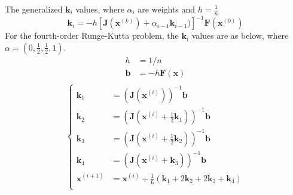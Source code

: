 \documentclass[8pt]{article}
\begin{document}
\begin{multicols}{2}
\begin{description}
    The generalized $\mathbf{k}_i$ values, where $\alpha_i$ are weights and $h=\frac{1}{n}$
    $$ \mathbf{k}_i = -h[\mathbf{J}(\mathbf{x}^{(k)})+\alpha_{i-1}\mathbf{k}_{i-1})]^{-1}\mathbf{F}(\mathbf{x}^{(0)}) $$
    For the fourth-order Runge-Kutta problem, the $\mathbf{k}_i$ values are as below,
    where $\alpha = (0, \frac{1}{2}, \frac{1}{2}, 1)$.
    \begin{equation*}
      \begin{aligned}
        h &= 1/n \\
        \mathbf{b} &=-h\mathbf{F}(\mathbf{x}) \\
      \end{aligned}
    \end{equation*}
    \begin{equation*}
      \left\{
        \begin{aligned}
          \mathbf{k}_1 &= (\mathbf{J}(\mathbf{x}^{(i)}))^{-1}\mathbf{b} \\
          \mathbf{k}_2 &= (\mathbf{J}(\mathbf{x}^{(i)}+\frac{1}{2}\mathbf{k}_1))^{-1}\mathbf{b} \\
          \mathbf{k}_3 &= (\mathbf{J}(\mathbf{x}^{(i)}+\frac{1}{2}\mathbf{k}_2))^{-1}\mathbf{b} \\
          \mathbf{k}_4 &= (\mathbf{J}(\mathbf{x}^{(i)}+\mathbf{k}_3))^{-1}\mathbf{b} \\
          \mathbf{x}^{(i+1)} &= \mathbf{x}^{(i)} + \frac{1}{6}(\mathbf{k}_1+2\mathbf{k}_2+2\mathbf{k}_3+\mathbf{k}_4) \\
        \end{aligned}
      \right.
    \end{equation*}
  \end{description}
\end{multicols}
\end{document}
